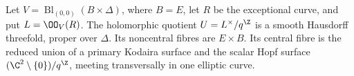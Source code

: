 
\begin{proposition}[P4.1]\hypertarget{tag-02WG}{}\label{night:P4.1}\label{stmt:P4.1}


Let $V=\operatorname{Bl}_{(0,0)}(B\times\Delta)$, where $B=E$, let $R$ be
the exceptional curve, and put $L=\OO_V(R)$. The holomorphic quotient
$U=L^\times/q^\Z$ is a smooth Hausdorff threefold, proper over $\Delta$.
Its noncentral fibres are $E\times B$. Its central fibre is the reduced
union of a primary Kodaira surface and the scalar Hopf surface
$(\C^2\setminus\{0\})/q^\Z$, meeting transversally in one elliptic curve.
\end{proposition}

